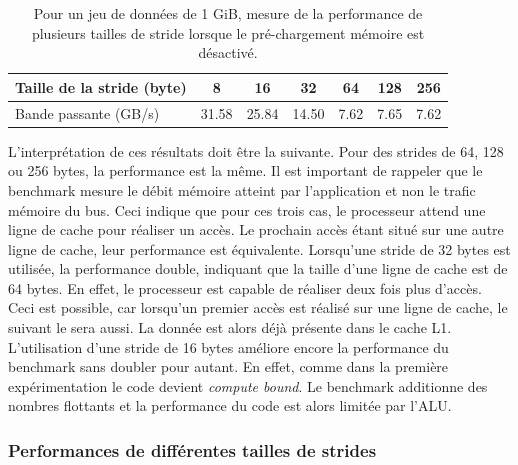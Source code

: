         \begin{table}[]
        \centering
        \begin{tabular}{|l|c|c|c|c|c|c|}
        \hline
        Taille de la stride (byte) & 8 & 16 & 32 & 64 & 128 & 256 \\ \hline
        Bande passante (GB/s) & 31.58 & 25.84 & 14.50 & 7.62 & 7.65 & 7.62 \\ \hline
        \end{tabular}%
        \caption{Pour un jeu de données de 1 GiB, mesure de la performance de plusieurs tailles de stride lorsque le pré-chargement mémoire est désactivé.}
        \label{tab:dml_cache_line}
        \end{table}
        
         L'interprétation de ces résultats doit être la suivante. Pour des strides de 64, 128 ou 256 bytes, la performance est la même. Il est important de rappeler que le benchmark mesure le débit mémoire atteint par l'application et non le trafic mémoire du bus. Ceci indique que pour ces trois cas, le processeur attend une ligne de cache pour réaliser un accès. Le prochain accès étant situé sur une autre ligne de cache, leur performance est équivalente. Lorsqu'une stride de 32 bytes est utilisée, la performance double, indiquant que la taille d'une ligne de cache est de 64 bytes. En effet, le processeur est capable de réaliser deux fois plus d'accès. Ceci est possible, car lorsqu'un premier accès est réalisé sur une ligne de cache, le suivant le sera aussi. La donnée est alors déjà présente dans le cache L1. L'utilisation d'une stride de 16 bytes améliore encore la performance du benchmark sans doubler pour autant. En effet, comme dans la première expérimentation le code devient \textit{compute bound}. Le benchmark additionne des nombres flottants et la performance du code est alors limitée par l'ALU. 
    
    
    \subsubsection{Performances de différentes tailles de strides} \label{sec:dml_bad_stride}
        
